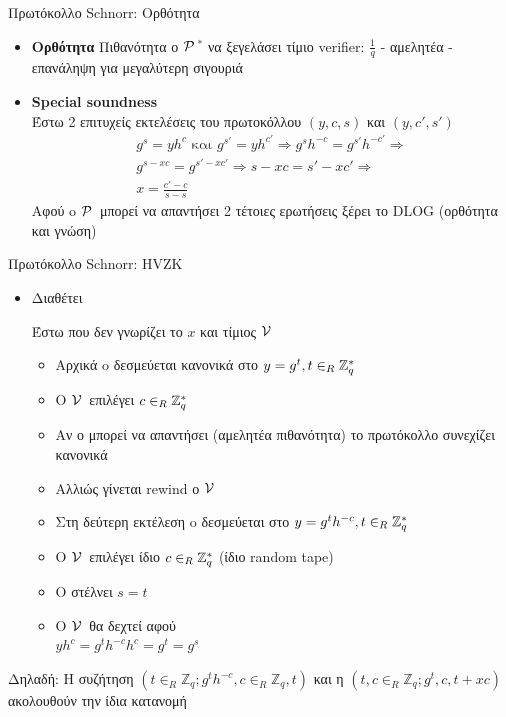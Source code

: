 \documentclass[10pt,handout]{beamer}
\begin{document}
\begin{frame}{Πρωτόκολλο Schnorr: Ορθότητα}
\begin{itemize}
\item \textbf{Ορθότητα} 
Πιθανότητα ο $\mathcal{P}\,$$^*$ να ξεγελάσει τίμιο verifier: $\frac{1}{q}$ - αμελητέα - επανάληψη για μεγαλύτερη σιγουριά
\pause
\item \textbf{Special soundness}\\
Έστω 2 επιτυχείς εκτελέσεις του πρωτοκόλλου $(y,c,s)$ και $(y,c',s')$
\pause
\begin{align*}
 g^s = yh^c  \text{ και }  g^{s'} = yh^{c'}  \Rightarrow  g^s h^{-c}   = g^{s'} h^{-c'}  \Rightarrow \\
 g^{s-xc} = g^{s'-xc'} \Rightarrow  s-xc = s'-xc' \Rightarrow \\
 x = \frac{c'-c}{s-s}
\end{align*}
\pause
Αφού o $\mathcal{P}\,$ μπορεί να απαντήσει 2 τέτοιες ερωτήσεις ξέρει το DLOG
(ορθότητα και γνώση)
\end{itemize}
\end{frame}


\begin{frame}{Πρωτόκολλο Schnorr: HVZK}
\begin{itemize}
\item Διαθέτει 

Έστω  \siml που δεν γνωρίζει το $x$ και τίμιος $\mathcal{V}\,$ 
\pause
\begin{itemize}
\item Αρχικά o \siml δεσμεύεται κανονικά στο $y=g^t, t \in_R \mathbb{Z}^*_{q}$
\pause
\item Ο $\mathcal{V}\,$ επιλέγει $c \in_R \mathbb{Z}^*_{q}$
\pause
\item Αν ο \siml μπορεί να απαντήσει (αμελητέα πιθανότητα) το πρωτόκολλο συνεχίζει κανονικά \pause
\item Αλλιώς γίνεται rewind ο $\mathcal{V}\,$  \pause
\item Στη δεύτερη εκτέλεση o \siml δεσμεύεται στο $y=g^t h^{-c}, t \in_R \mathbb{Z}^*_{q}$ \pause
\item Ο $\mathcal{V}\,$ επιλέγει ίδιο $c \in_R \mathbb{Z}^*_{q}$ (ίδιο random tape) \pause
\item O \siml στέλνει $s=t$ \pause
\item Ο $\mathcal{V}\,$ θα δεχτεί αφού \\
$yh^{c} = g^t  h^{-c} h^{c} = g^t = g^s$ \\
\end{itemize}
\end{itemize}
\pause
 
\begin{block}{Δηλαδή:}
Η συζήτηση $(t \in_R \mathbb{Z}_q; g^t h^{-c}   , c \in_R \mathbb{Z}_q  , t )$ 
 και η $(t,c \in_R \mathbb{Z}_q;  g^t  , c  , t+xc  )$
 ακολουθούν την ίδια κατανομή
 \end{block}
\end{frame}
\end{document}
